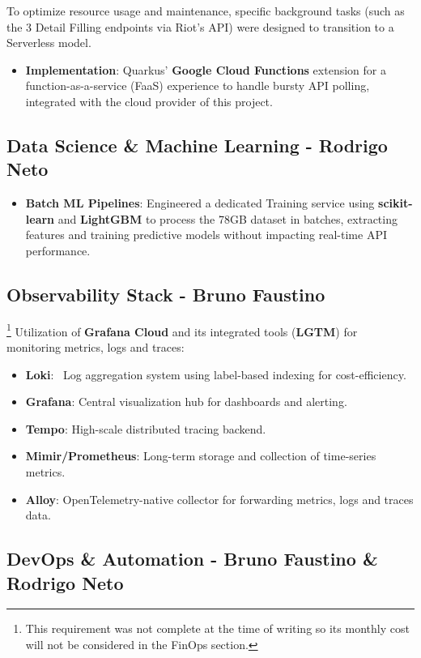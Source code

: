 \documentclass[11pt,a4paper]{article}
\newcommand{\bff}[1]{\textbf{#1}}
\begin{document}
 To optimize resource usage and maintenance, specific background tasks (such as the 3 Detail Filling endpoints via Riot's API) were designed to transition to a Serverless model.
 \begin{itemize}
  \item \bff{Implementation}: Quarkus' \bff{Google Cloud Functions} extension for a function-as-a-service (FaaS) experience to handle bursty API polling, integrated with the cloud provider of this project.
 \end{itemize}
 
 \subsection{Data Science \& Machine Learning - Rodrigo Neto}
 
 \begin{itemize}
  \item \bff{Batch ML Pipelines}: Engineered a dedicated Training service using \bff{scikit-learn} and \bff{LightGBM} to process the 78GB dataset in batches, extracting features and training predictive models without impacting real-time API performance.
 \end{itemize}

 \subsection{Observability Stack - Bruno Faustino}

 \footnote{\label{foot1}This requirement was not complete at the time of writing so its monthly cost will not be considered in the FinOps section.}
 Utilization of \bff{Grafana Cloud} and its integrated tools (\bff{LGTM}) for monitoring metrics, logs and traces:
 \begin{itemize}
  \item \bff{Loki}:  Log aggregation system using label-based indexing for cost-efficiency.
  \item \bff{Grafana}: Central visualization hub for dashboards and alerting.
  \item \bff{Tempo}: High-scale distributed tracing backend.
  \item \bff{Mimir/Prometheus}: Long-term storage and collection of time-series metrics.
  \item \bff{Alloy}: OpenTelemetry-native collector for forwarding metrics, logs and traces data.
 \end{itemize}

 \subsection{DevOps \& Automation - Bruno Faustino \& Rodrigo Neto}
 
\end{document}
